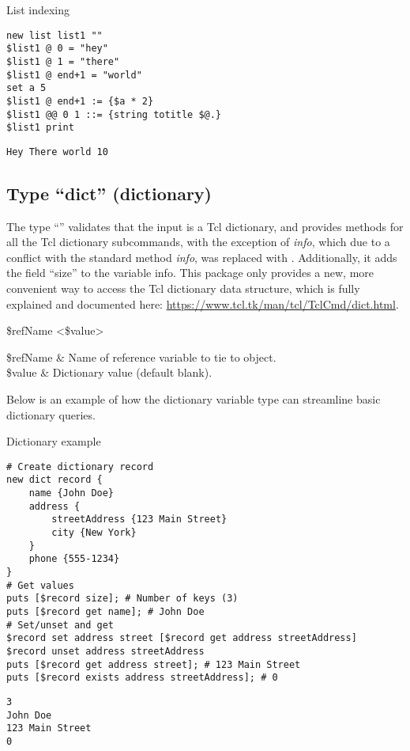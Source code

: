 \documentclass{article}
\begin{document}
\begin{example}{List indexing}
\begin{lstlisting}
new list list1 ""
$list1 @ 0 = "hey"
$list1 @ 1 = "there"
$list1 @ end+1 = "world"
set a 5
$list1 @ end+1 := {$a * 2}
$list1 @@ 0 1 ::= {string totitle $@.}
$list1 print
\end{lstlisting}
\tcblower
\begin{lstlisting}
Hey There world 10
\end{lstlisting}
\end{example}

\clearpage
\subsection{Type ``dict'' (dictionary)}
The type ``'' validates that the input is a Tcl dictionary, and provides methods for all the Tcl dictionary subcommands, with the exception of \textit{info}, which due to a conflict with the standard method \textit{info}, was replaced with . 
Additionally, it adds the field ``size'' to the variable info. 
This package only provides a new, more convenient way to access the Tcl dictionary data structure, which is fully explained and documented here: \url{https://www.tcl.tk/man/tcl/TclCmd/dict.html}.
\begin{syntax}
 \$refName <\$value>
\end{syntax}
\begin{args}
\$refName & Name of reference variable to tie to object. \\
\$value & Dictionary value (default blank).
\end{args}
Below is an example of how the dictionary variable type can streamline basic dictionary queries.
\begin{example}{Dictionary example}
\begin{lstlisting}
# Create dictionary record
new dict record {
    name {John Doe}
    address {
        streetAddress {123 Main Street}
        city {New York}
    }
    phone {555-1234} 
}
# Get values
puts [$record size]; # Number of keys (3)
puts [$record get name]; # John Doe
# Set/unset and get
$record set address street [$record get address streetAddress]
$record unset address streetAddress
puts [$record get address street]; # 123 Main Street
puts [$record exists address streetAddress]; # 0
\end{lstlisting}
\tcblower
\begin{lstlisting}
3
John Doe
123 Main Street
0
\end{lstlisting}
\end{example}
\end{document}
